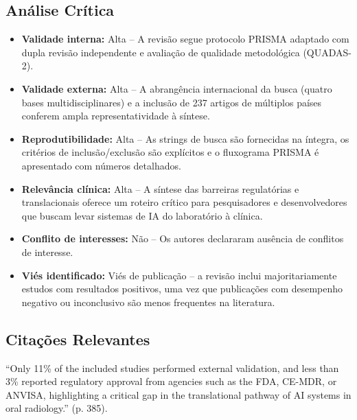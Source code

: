 \subsection{Análise Crítica}
\begin{itemize}
  \item \textbf{Validade interna:} Alta -- A revisão segue protocolo
        PRISMA adaptado com dupla revisão independente e avaliação de
        qualidade metodológica (QUADAS-2).
  \item \textbf{Validade externa:} Alta -- A abrangência internacional da
        busca (quatro bases multidisciplinares) e a inclusão de 237 artigos
        de múltiplos países conferem ampla representatividade à síntese.
  \item \textbf{Reprodutibilidade:} Alta -- As strings de busca são
        fornecidas na íntegra, os critérios de inclusão/exclusão são
        explícitos e o fluxograma PRISMA é apresentado com números
        detalhados.
  \item \textbf{Relevância clínica:} Alta -- A síntese das barreiras
        regulatórias e translacionais oferece um roteiro crítico para
        pesquisadores e desenvolvedores que buscam levar sistemas de IA
        do laboratório à clínica.
  \item \textbf{Conflito de interesses:} Não -- Os autores declararam
        ausência de conflitos de interesse.
  \item \textbf{Viés identificado:} Viés de publicação -- a revisão inclui
        majoritariamente estudos com resultados positivos, uma vez que
        publicações com desempenho negativo ou inconclusivo são menos
        frequentes na literatura.
\end{itemize}

\subsection{Citações Relevantes}
\begin{citacao}
``Only 11\% of the included studies performed external validation, and less
than 3\% reported regulatory approval from agencies such as the FDA, CE-MDR,
or ANVISA, highlighting a critical gap in the translational pathway of
AI systems in oral radiology.'' (p. 385).
\end{citacao}

